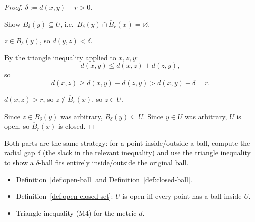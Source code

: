 \begin{proof}
\Let $\delta := d(x, y) - r > 0$.

\Goal Show $B_\delta(y) \subseteq U$, i.e.\ $B_\delta(y) \cap \overline{B}_r(x) = \varnothing$.

\Let $z \in B_\delta(y)$, so $d(y, z) < \delta$.

By the triangle inequality applied to $x, z, y$:
\[
d(x, y) \le d(x, z) + d(z, y),
\]
so
\[
d(x, z) \ge d(x, y) - d(z, y) > d(x, y) - \delta = r.
\]

\Therefore $d(x, z) > r$, so $z \notin \overline{B}_r(x)$, so $z \in U$.

Since $z \in B_\delta(y)$ was arbitrary, $B_\delta(y) \subseteq U$.
Since $y \in U$ was arbitrary, $U$ is open, so $\overline{B}_r(x)$ is closed. \AsReq
\end{proof}

\begin{remark*}
Both parts are the same strategy: for a point inside/outside a ball,
compute the radial gap $\delta$ (the slack in the relevant inequality)
and use the triangle inequality to show a $\delta$-ball fits entirely
inside/outside the original ball.
\end{remark*}

\begin{remark*}[Dependencies]
\begin{itemize}
  \item Definition~\ref{def:open-ball} and Definition~\ref{def:closed-ball}.
  \item Definition~\ref{def:open-closed-set}: $U$ is open iff every point has a ball inside $U$.
  \item Triangle inequality (M4) for the metric $d$.
\end{itemize}
\end{remark*}
